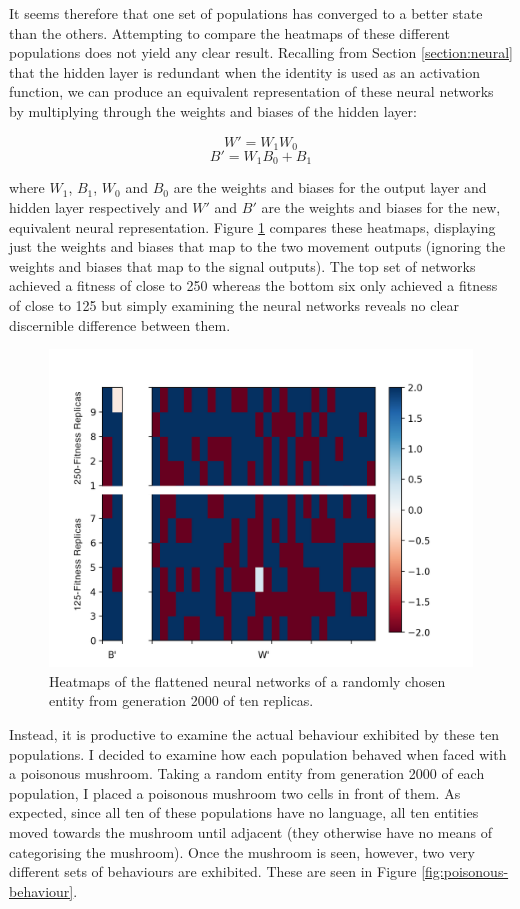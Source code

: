 \documentclass[12pt,a4paper,twoside,openright]{report}
\begin{document}
It seems therefore that one set of populations has converged to a better state than the others. Attempting to compare the heatmaps of these different populations does not yield any clear result. Recalling from Section \ref{section:neural} that the hidden layer is redundant when the identity is used as an activation function, we can produce an equivalent representation of these neural networks by multiplying through the weights and biases of the hidden layer:

$$ W' = W_1 W_0 $$
$$ B' = W_1 B_0 + B_1 $$

where $W_1$, $B_1$, $W_0$ and $B_0$ are the weights and biases for the output layer and hidden layer respectively and $W'$ and $B'$ are the weights and biases for the new, equivalent neural representation. Figure \ref{fig:compare} compares these heatmaps, displaying just the weights and biases that map to the two movement outputs (ignoring the weights and biases that map to the signal outputs). The top set of networks achieved a fitness of close to 250 whereas the bottom six only achieved a fitness of close to 125 but simply examining the neural networks reveals no clear discernible difference between them.

\begin{figure}[t]
  \centering
  \includegraphics[width=1.\linewidth]{results/compare2}
  \caption{Heatmaps of the flattened neural networks of a randomly chosen entity from generation 2000 of ten replicas.}
  \label{fig:compare}
\end{figure}

Instead, it is productive to examine the actual behaviour exhibited by these ten populations. I decided to examine how each population behaved when faced with a poisonous mushroom. Taking a random entity from generation 2000 of each population, I placed a poisonous mushroom two cells in front of them. As expected, since all ten of these populations have no language, all ten entities moved towards the mushroom until adjacent (they otherwise have no means of categorising the mushroom). Once the mushroom is seen, however, two very different sets of behaviours are exhibited. These are seen in Figure \ref{fig:poisonous-behaviour}.
\end{document}
